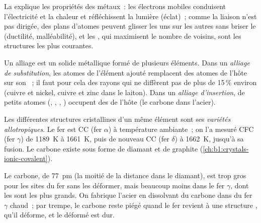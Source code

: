 \begin{proposition}\label{prop:b1:crystals-metals:properties}
La  explique les propriétés des métaux~: les électrons
mobiles conduisent l'électricité et la chaleur et réfléchissent la
lumière (éclat)~; comme la liaison n'est pas dirigée, des plans d'atomes
peuvent glisser les uns sur les autres sans briser le 
(ductilité, malléabilité), et les , qui maximisent
le nombre de voisins, sont les structures les plus courantes.
\end{proposition}
\admitted

\begin{definition}[Alliages]\label{def:b1:crystals-metals:alloy}
Un alliage est un solide métallique formé de plusieurs éléments. Dans un
\emph{alliage de substitution}, les atomes
de l'élément ajouté remplacent des atomes de l'hôte sur son ~; il
faut pour cela des rayons qui ne diffèrent pas de plus de 15\,\% environ
(cuivre et nickel, cuivre et zinc dans le laiton). Dans un
\emph{alliage d'insertion}, de petits atomes
(, , , ) occupent des  de
l'hôte (le carbone dans l'acier).
\end{definition}

\begin{definition}[Allotropie]\label{def:b1:crystals-metals:allotropy}
Les différentes structures cristallines d'un même élément sont ses
\emph{variétés allotropiques}. Le fer est CC (fer $\alpha$) à
température ambiante~; on l'a mesuré CFC (fer $\gamma$) de
\qty{1189}{K} à \qty{1661}{K}, puis de nouveau CC (fer $\delta$) à
\qty{1662}{K}, jusqu'à sa fusion. Le carbone existe sous forme de
diamant et de graphite (\cref{ch:b1:crystals-ionic-covalent}).
\end{definition}

\begin{example}[L'acier]\label{ex:b1:crystals-metals:steel}
Le carbone, de  \qty{77}{pm} (la moitié de la distance
 dans le diamant), est trop gros pour les sites du fer sans les
déformer, mais beaucoup moins dans le fer $\gamma$, dont les  sont les plus grands. On fabrique l'acier en dissolvant du
carbone dans du fer $\gamma$ chaud~; par trempe, le carbone reste piégé
quand le fer revient à une structure , qu'il déforme, et
le  déformé est dur.
\end{example}

